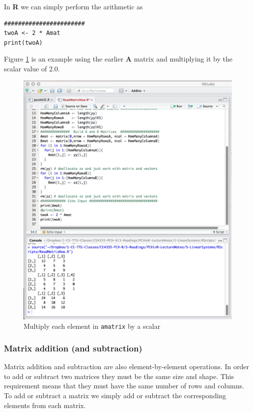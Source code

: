 In \textbf{R} we can simply perform the arithmetic as

\begin{lstlisting}[caption=R code demonstrating scalar multiplication , label=lst:ScalarMultiply]
#######################
twoA <- 2 * Amat
print(twoA)
\end{lstlisting}


Figure \ref{fig:ScalarMultiply} is an example using the earlier $\mathbf{A}$ matrix and multiplying it by the scalar value of 2.0.   

\begin{figure}[h!] %
   \centering
   \includegraphics[width=6in]{./5-LinearSystems/ScalarMultiply.jpg} 
   \caption{Multiply each element in \texttt{amatrix} by a scalar }
   \label{fig:ScalarMultiply}
\end{figure}

\clearpage
 \subsubsection{Matrix addition (and subtraction)}
Matrix addition and subtraction are also element-by-element operations.
In order to add or subtract two matrices they must be the same size and shape.  
This requirement means that they must have the same number of rows and columns.  
To add or subtract a matrix we simply add or subtract the corresponding elements from each matrix.


